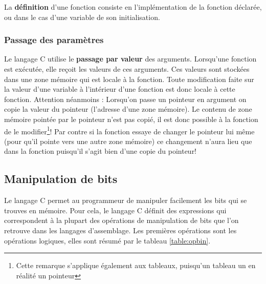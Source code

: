 La \textbf{définition} d'une fonction consiste en l'implémentation de la fonction déclarée, ou dans le cas d'une variable de son initialisation.

\subsubsection{Passage des paramètres}
Le langage C utilise le \textbf{passage par valeur} des arguments.
Lorsqu'une fonction est exécutée, elle reçoit les valeurs de ces arguments.
Ces valeurs sont stockées dans une zone mémoire qui est locale à la fonction.
Toute modification faite sur la valeur d'une variable à l'intérieur d'une fonction est donc locale à cette fonction.
Attention néanmoins : Lorsqu'on passe un pointeur en argument on copie la valeur du pointeur (l'adresse d'une zone mémoire).
Le contenu de zone mémoire pointée par le pointeur n'est pas copié, il est donc possible à la fonction de le modifier\footnote{Cette remarque s'applique également aux tableaux, puisqu'un tableau un en réalité un pointeur}!
Par contre  si la fonction essaye de changer le pointeur lui même (pour qu'il pointe vers une autre zone mémoire) ce changement n'aura lieu que dans la fonction puisqu'il s'agit bien d'une copie du pointeur!


\subsection{Manipulation de bits}
Le langage C permet au programmeur de manipuler facilement les bits qui se trouves en mémoire.
Pour cela, le langage C définit des expressions qui correspondent à la plupart des opérations de manipulation de bits que l'on retrouve dans les langages d'assemblage.
Les premières opérations sont les opérations logiques, elles sont résumé par le tableau \ref{table:opbin}.


